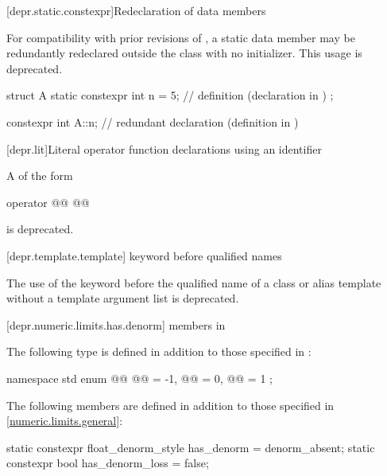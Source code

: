 [depr.static.constexpr]{Redeclaration of  data members}

\pnum
For compatibility with prior revisions of \Cpp{}, a 
static data member may be redundantly redeclared outside the class with no
initializer.
This usage is deprecated.
\begin{example}
\begin{codeblock}
struct A {
  static constexpr int n = 5;   // definition (declaration in \CppXIV{})
};

constexpr int A::n;             // redundant declaration (definition in \CppXIV{})
\end{codeblock}
\end{example}

[depr.lit]{Literal operator function declarations using an identifier}

\pnum
A  of the form
\begin{codeblock}
operator @@ @@
\end{codeblock}
is deprecated.

[depr.template.template]{ keyword before qualified names}

\pnum
The use of the keyword 
before the qualified name of a class or alias template
without a template argument list is deprecated.

[depr.numeric.limits.has.denorm]{ members in }

\pnum
The following type is defined
in addition to those specified in :
\begin{codeblock}
namespace std {
  enum @@ {
    @@ = -1,
    @@ = 0,
    @@ = 1
  };
}
\end{codeblock}

\pnum
{}%
%
%
%
The following members are defined
in addition to those specified in \ref{numeric.limits.general}:
\begin{codeblock}
static constexpr float_denorm_style has_denorm = denorm_absent;
static constexpr bool has_denorm_loss = false;
\end{codeblock}

